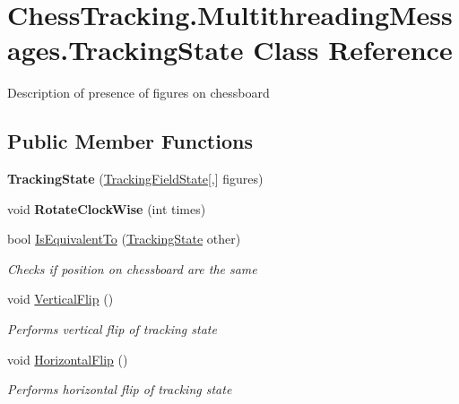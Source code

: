 \hypertarget{class_chess_tracking_1_1_multithreading_messages_1_1_tracking_state}{}\section{Chess\+Tracking.\+Multithreading\+Messages.\+Tracking\+State Class Reference}
\label{class_chess_tracking_1_1_multithreading_messages_1_1_tracking_state}


Description of presence of figures on chessboard  


\subsection*{Public Member Functions}
\begin{DoxyCompactItemize}
\item 
\mbox{\label{class_chess_tracking_1_1_multithreading_messages_1_1_tracking_state_af9552ddc2b69450ab1a44af092d21f2d}} 
{\bfseries Tracking\+State} (\mbox{\hyperlink{namespace_chess_tracking_1_1_multithreading_messages_ac10ea87452f4fb70b8c6abe5792fcb92}{Tracking\+Field\+State}}\mbox{[},\mbox{]} figures)
\item 
\mbox{\label{class_chess_tracking_1_1_multithreading_messages_1_1_tracking_state_aca5fa2d1dee3e035fec7fd9aa0ba3371}} 
void {\bfseries Rotate\+Clock\+Wise} (int times)
\item 
bool \mbox{\hyperlink{class_chess_tracking_1_1_multithreading_messages_1_1_tracking_state_a6ee75ae80363cafcc7b00a26ddcbcf33}{Is\+Equivalent\+To}} (\mbox{\hyperlink{class_chess_tracking_1_1_multithreading_messages_1_1_tracking_state}{Tracking\+State}} other)
\begin{DoxyCompactList}\small\item\em Checks if position on chessboard are the same \end{DoxyCompactList}\item 
void \mbox{\hyperlink{class_chess_tracking_1_1_multithreading_messages_1_1_tracking_state_a157ef0597a15200a8371905b787b32aa}{Vertical\+Flip}} ()
\begin{DoxyCompactList}\small\item\em Performs vertical flip of tracking state \end{DoxyCompactList}\item 
void \mbox{\hyperlink{class_chess_tracking_1_1_multithreading_messages_1_1_tracking_state_a27f5bd51ff124b6c3a641cd209fe811b}{Horizontal\+Flip}} ()
\begin{DoxyCompactList}\small\item\em Performs horizontal flip of tracking state \end{DoxyCompactList}\end{DoxyCompactItemize}
